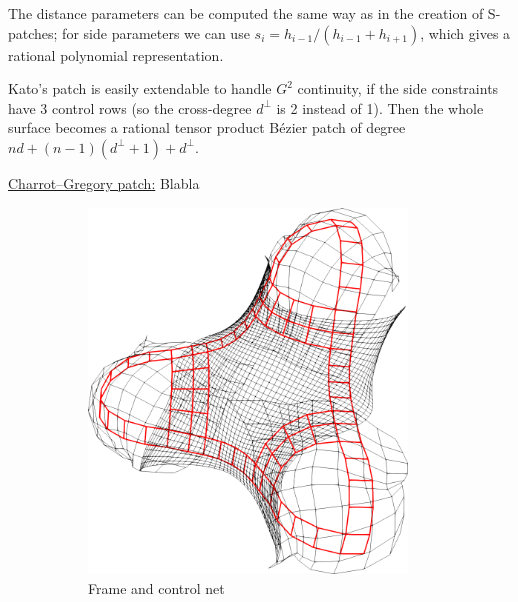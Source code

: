 \documentclass{article}
\begin{document}
The distance parameters can be computed the same way as in the creation of S-patches; for side
parameters we can use $s_i=h_{i-1}/(h_{i-1}+h_{i+1})$, which gives a rational polynomial
representation.

Kato's patch is easily extendable to handle $G^2$ continuity, if the side constraints have 3
control rows (so the cross-degree $d^\perp$ is 2 instead of 1).
Then the whole surface becomes a rational tensor product B\'ezier patch of
degree $nd+(n-1)(d^\perp+1)+d^\perp$.

\vspace{10pt}
\noindent\underline{Charrot--Gregory patch:}\vspace{0.2em}\newline
Blabla
\begin{figure}[h!]
  \begin{subfigure}{0.23\textwidth}
    \centering
    \includegraphics[width = 0.93\textwidth]{images/trebol3-cnet.png}
    \caption{Frame and control net}
    \label{fig:trebol-cnet}
  \end{subfigure}
  \begin{subfigure}{0.23\textwidth}

\end{subfigure}
\end{figure}
\end{document}

